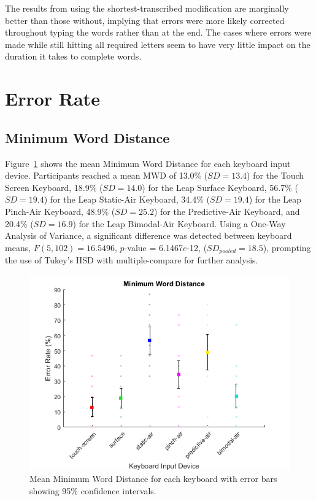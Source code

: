 The results from using the shortest-transcribed modification are marginally better than those without, implying that errors were more likely corrected throughout typing the words rather than at the end. The cases where errors were made while still hitting all required letters seem to have very little impact on the duration it takes to complete words.

\section{Error Rate}

\subsection{Minimum Word Distance}
Figure~\ref{fig_MWD_mean} shows the mean Minimum Word Distance for each keyboard input device. Participants reached a mean MWD of 13.0\% ($SD = 13.4$) for the Touch Screen Keyboard, 18.9\% ($SD = 14.0$) for the Leap Surface Keyboard, 56.7\% ($SD = 19.4$) for the Leap Static-Air Keyboard, 34.4\% ($SD = 19.4$) for the Leap Pinch-Air Keyboard, 48.9\% ($SD = 25.2$) for the Predictive-Air Keyboard, and 20.4\% ($SD = 16.9$) for the Leap Bimodal-Air Keyboard. Using a One-Way Analysis of Variance, a significant difference was detected between keyboard means, $F(5, 102) = 16.5496$, $p$-value = 6.1467$e$-12, ($SD_{pooled} = 18.5$), prompting the use of Tukey's HSD with multiple-compare for further analysis.

\begin{figure}[h]
	\centering
	\includegraphics{fig_MWD_mean}
	\caption[Mean Minimum Word Distance]{Mean Minimum Word Distance for each keyboard with error bars showing 95\% confidence intervals.}
	\label{fig_MWD_mean}
\end{figure}

